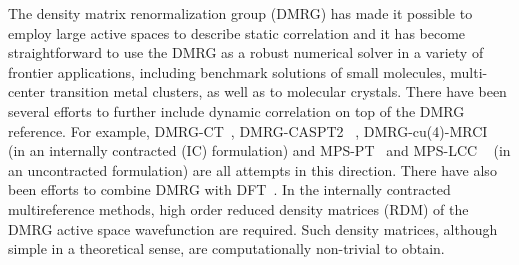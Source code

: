 The density matrix renormalization group (DMRG) \cite{white_density_1992,white_density-matrix_1993, ostlund_thermodynamic_1995, rommer_class_1997, schollwock_density-matrix_2005, schollwock_density-matrix_2011} has made it possible to employ  large active spaces 
to describe static correlation\cite{white_ab_1999, chan_highly_2002, legeza_controlling_2003,moritz_decomposition_2007, verstraete_matrix_2008, marti_density_2008, zgid_spin_2008, marti_density_2010, kurashige_high-performance_2009, luo_optimizing_2010, chan_density_2011, marti_new_2011, sharma_spin-adapted_2012, wouters_longitudinal_2012, wouters_thouless_2013, kurashige_entangled_2013, wouters_communication:_2014} and it has become straightforward to
use the DMRG as a robust numerical solver in a variety of frontier applications, including benchmark solutions of small molecules\cite{chan_highly_2002,legeza_controlling_2003,luo_optimizing_2010, olivares-amaya_ab-initio_2015}, multi-center transition metal clusters\cite{kurashige_high-performance_2009,marti_new_2011, kurashige_entangled_2013, sharma_low-energy_2014}, as well as to molecular crystals\cite{yang_ab_2014}. There have been several
efforts to further include dynamic correlation on top of the DMRG reference.
For example, DMRG-CT~\cite{neuscamman_review_2010}, DMRG-CASPT2 ~\cite{kurashige_second-order_2011}, DMRG-cu(4)-MRCI ~\cite{saitow_fully_2015} (in an internally contracted (IC) formulation) and MPS-PT~\cite{sharma_communication:_2014} and MPS-LCC ~\cite{sharma_multireference_2015} (in an uncontracted
formulation) 
are all attempts in this direction. There have also been efforts to combine DMRG with DFT~\cite{reiher_density_2015}.
In the internally contracted multireference methods, high order reduced density matrices (RDM) of the DMRG active space wavefunction are required.
Such density matrices, although simple in a theoretical sense, are computationally non-trivial to obtain.

